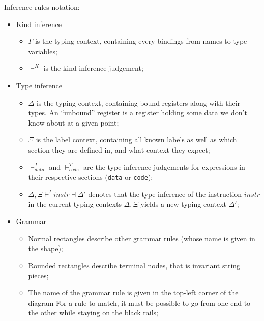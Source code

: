 Inference rules notation:
\begin{itemize}
  \item Kind inference
        \begin{itemize}
          \item $\Gamma$ is the typing context, containing every bindings from names to type variables;
          \item $\vdash^{K}$ is the kind inference judgement;
        \end{itemize}
  \item Type inference
        \begin{itemize}
          \item $\Delta$ is the typing context, containing bound registers along with their types.
                An ``unbound'' register is a register holding some data we don't know about at a given point;
          \item $\Xi$ is the label context, containing all known labels as well as which section they are defined in, and what context they expect;
          \item $\vdash^{T}_{data}$ and $\vdash^{T}_{code}$ are the type inference judgements for expressions in their respective sections (\texttt{data} or \texttt{code});
          \item $\Delta,\Xi\vdash^{I}instr\dashv\Delta'$ denotes that the type inference of the instruction $instr$ in the current typing contexts $\Delta,\Xi$ yields a new typing context $\Delta'$;
        \end{itemize}
  \item Grammar
        \begin{figure}[H]
          \centering
        \end{figure}
        \begin{itemize}
          \item Normal rectangles describe other grammar rules (whose name is given in the shape);
          \item Rounded rectangles describe terminal nodes, that is invariant string pieces;
          \item The name of the grammar rule is given in the top-left corner of the diagram
                For a rule to match, it must be possible to go from one end to the other while staying on the black rails;
        \end{itemize}
\end{itemize}

